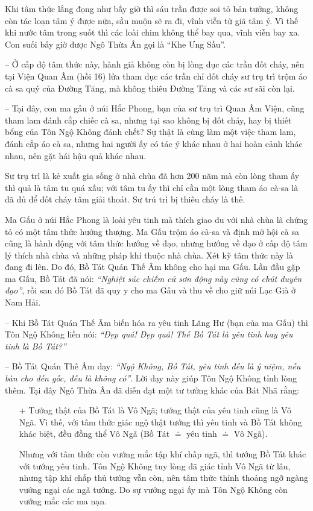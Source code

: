 Khi tâm thức lắng đọng như bấy giờ thì sáu trần được soi tỏ bản tướng, không còn tác loạn tâm ý được nữa, sầu muộn sẽ ra đi, vĩnh viễn từ giã tâm ý. Vì thế khi nước tâm trong suốt thì các loài chim không thể bay qua, vĩnh viễn bay xa. Con suối bấy giờ được Ngô Thừa Ân gọi là ``Khe Ưng Sầu''.

-- Ở cấp độ tâm thức này, hành giả không còn bị lòng dục các trần đốt cháy, nên tại Viện Quan Âm (hồi 16) lửa tham dục các trần chỉ đốt cháy sư trụ trì trộm áo cà sa quý của Đường Tăng, mà không thiêu Đường Tăng và các sư sãi còn lại.

-- Tại đây, con ma gấu ở núi Hắc Phong, bạn của sư trụ trì Quan Âm Viện, cũng tham lam đánh cắp chiếc cà sa, nhưng tại sao không bị đốt cháy, hay bị thiết bổng của Tôn Ngộ Không đánh chết? Sự thật là cùng làm một việc tham lam, đánh cắp áo cà sa, nhưng hai người ấy có tác ý khác nhau ở hai hoàn cảnh khác nhau, nên gặt hái hậu quả khác nhau.

Sư trụ trì là kẻ xuất gia sống ở nhà chùa đã hơn 200 năm mà còn lòng tham ấy thì quả là tâm tu quá xấu; với tâm tu ấy thì chỉ cần một lòng tham áo cà-sa là đã đủ để đốt cháy tâm giải thoát. Sư trú trì bị thiêu cháy là thế.

Ma Gấu ở núi Hắc Phong là loài yêu tinh mà thích giao du với nhà chùa là chứng tỏ có một tâm thức hướng thượng. Ma Gấu trộm áo cà-sa và định mở hội cà sa cũng là hành động với tâm thức hướng về đạo, nhưng hướng về đạo ở cấp độ tâm lý thích nhà chùa và những pháp khí thuộc nhà chùa. Xét kỹ tâm thức này là đang đi lên. Do đó, Bồ Tát Quán Thế Âm không cho hại ma Gấu. Lần đầu gặp ma Gấu, Bồ Tát đã nói: \emph{``Nghiệt súc chiếm cứ sơn động này cũng có chút duyên đạo''}, rồi sau đó Bồ Tát đã quy y cho ma Gấu và thu về cho giữ núi Lạc Già ở Nam Hải.

-- Khi Bồ Tát Quán Thế Âm biến hóa ra yêu tinh Lăng Hư (bạn của ma Gấu) thì Tôn Ngộ Không liền nói: \emph{``Đẹp quá! Đẹp quá! Thế Bồ Tát là yêu tinh hay yêu tinh là Bồ Tát?''}

-- Bồ Tát Quán Thế Âm dạy: \emph{``Ngộ Không, Bồ Tát, yêu tinh đều là ý niệm, nếu bàn cho đến gốc, đều là không có''}. Lời dạy này giúp Tôn Ngộ Không tỉnh lòng thêm. Tại đây Ngô Thừa Ân đã diễn đạt một tư tưởng khác của Bát Nhã rằng:

\begin{enumerate}[label=\itshape\arabic*\upshape/]
    \item[+] Tướng thật của Bồ Tát là Vô Ngã; tướng thật của yêu tinh cũng là Vô Ngã. Vì thế, với tâm thức giác ngộ thật tướng thì yêu tinh và Bồ Tát không khác biệt, đều đồng thể Vô Ngã (Bồ Tát $\doteq$ yêu tinh $\doteq$ Vô Ngã).

    Nhưng với tâm thức còn vướng mắc tập khí chấp ngã, thì tướng Bồ Tát khác với tướng yêu tinh. Tôn Ngộ Không tuy lòng đã giác tỉnh Vô Ngã từ lâu, nhưng tập khí chấp thủ tướng vẫn còn, nên tâm thức thỉnh thoảng ngỡ ngàng vướng ngại các ngã tướng. Do sự vướng ngại ấy mà Tôn Ngộ Không còn vướng mắc các ma nạn.
\end{enumerate}

